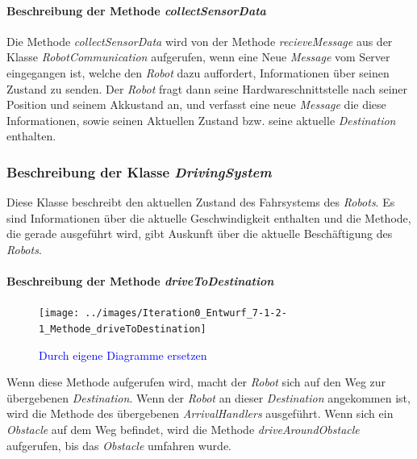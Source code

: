 			\paragraph{Beschreibung der Methode \textit{collectSensorData}}
			Die Methode \textit{collectSensorData} wird von der Methode \textit{recieveMessage} 
			aus der Klasse \textit{RobotCommunication} aufgerufen, wenn eine Neue \textit{Message} 
			vom Server eingegangen ist, welche den \textit{Robot} dazu auffordert, Informationen 
			über seinen Zustand zu senden. Der \textit{Robot} fragt dann seine Hardwareschnittstelle 
			nach seiner Position und seinem Akkustand an, und verfasst eine neue \textit{Message} 
			die diese Informationen, sowie seinen Aktuellen Zustand bzw. seine aktuelle \textit{Destination} enthalten.

	\subsubsection{Beschreibung der Klasse \textit{DrivingSystem}}
		
		Diese Klasse beschreibt den aktuellen Zustand des Fahrsystems des \textit{Robots}. 
		Es sind Informationen über die aktuelle Geschwindigkeit enthalten und die Methode, 
		die gerade ausgeführt wird, gibt Auskunft über die aktuelle Beschäftigung des \textit{Robots}.

			\paragraph{Beschreibung der Methode \textit{driveToDestination}}
			\begin{figure}[H]
			\centering
			\texttt{[image: ../images/Iteration0\_Entwurf\_7-1-2-1\_Methode\_driveToDestination]}
			\caption{\textcolor{blue}{Durch eigene Diagramme ersetzen}}
			\label{BeschreibungKlasse1}
			\end{figure}

			Wenn diese Methode aufgerufen wird, macht der \textit{Robot} sich auf den Weg zur 
			übergebenen \textit{Destination}. Wenn der \textit{Robot} an dieser \textit{Destination} 
			angekommen ist, wird die Methode des übergebenen \textit{ArrivalHandlers} ausgeführt. 
			Wenn sich ein \textit{Obstacle} auf dem Weg befindet, wird die Methode \textit{driveAroundObstacle} 
			aufgerufen, bis das \textit{Obstacle} umfahren wurde.

